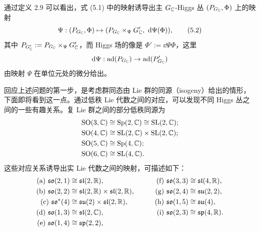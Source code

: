 
通过定义 2.9 可以看出，式 (5.1) 中的映射诱导出主 $G_{\mathbb{C}}$-Higgs 丛 $(P_{G_{\mathbb{C}}},\Phi)$ 上的映射
\begin{equation}
\Psi : (P_{G_{\C}},\Phi)\mapsto(P_{G_{\C}}\times_{\Psi}G'_{\C},\ \dd\Psi(\Phi)), \tag{5.2}
\end{equation}
其中 $P_{G'_{\mathbb{C}}} := P_{G_{\mathbb{C}}}\times_{\Psi}G'_{\mathbb{C}}$，而 Higgs 场的像是 $\Phi' := \dd\Psi\Phi$，这里
\[
\mathrm{d}\Psi : \mathrm{ad}(P_{G_{\mathbb{C}}})\to\mathrm{ad}(P'_{G_{\mathbb{C}}})
\]
由映射 $\Psi$ 在单位元处的微分给出。


回应上述问题的第一步，是考虑群同态由 Lie 群的同源（isogeny）给出的情形，下面即将看到这一点。通过低秩 Lie 代数之间的对应，可以发现不同 Higgs 丛之间的一些有趣关系。复 Lie 群之间的部分低秩同源为
\begin{align*}
\mathrm{SO}(3,\mathbb{C}) &\cong\mathrm{Sp}(2,\mathbb{C})\cong\mathrm{SL}(2,\mathbb{C});\\
\mathrm{SO}(4,\mathbb{C}) &\cong\mathrm{SL}(2,\mathbb{C})\times\mathrm{SL}(2,\mathbb{C});\\
\mathrm{SO}(5,\mathbb{C}) &\cong\mathrm{Sp}(4,\mathbb{C});\\
\mathrm{SO}(6,\mathbb{C}) &\cong\mathrm{SL}(4,\mathbb{C}).
\end{align*}
这些对应关系诱导出实 Lie 代数之间的映射，可描述如下：
\begin{alignat*}{2}
\text{(a)}\ \fso(2,1) &\cong\fsl(2,\R), &\qquad \text{(f)}\ \fso(3,3) &\cong\fsl(4,\R),\\
\text{(b)}\ \fso(2,2) &\cong\fsl(2,\R)\times\fsl(2,\R), &\qquad \text{(g)}\ \fso(2,4) &\cong\fsu(2,2),\\
\text{(c)}\ \fso^*(4) &\cong\fsu(2)\times\fsl(2,\R), &\qquad \text{(h)}\ \fso(1,5) &\cong\fsu(4),\\
\text{(d)}\ \fso(1,3) &\cong\fsl(2,\C), &\qquad \text{(i)}\ \fso(2,3) &\cong\fsp(4,\R).\\
\text{(e)}\ \fso(1,4) &\cong\fsp(2,2),
\end{alignat*}

